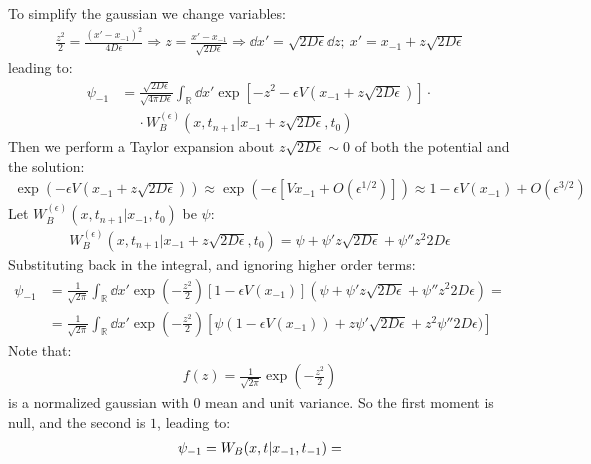 \documentclass[../template.tex]{subfiles}
\begin{document}
\begin{exo}
\begin{enumerate}
        To simplify the gaussian we change variables:
        \begin{align*}
           \frac{z^2}{2}  = \frac{(x'-x_{-1})^2}{4 D \epsilon}  \Rightarrow z = \frac{x'-x_{-1}}{\sqrt{2D \epsilon}} \Rightarrow \dd{x'} = \sqrt{2 D \epsilon} \dd{z}; \> x'=x_{-1}+z\sqrt{2 D \epsilon}
        \end{align*}
        leading to:
        \begin{align*}
            \psi_{-1} &= \frac{\sqrt{2 D \epsilon}}{\sqrt{4 \pi D \epsilon}} \int_{\mathbb{R}} \dd{x'} \exp\left[-z^2 - \epsilon V(x_{-1}+z\sqrt{2D \epsilon})\right]\cdot\\
            &\quad\> \cdot W_B^{(\epsilon)}(x, t_{n+1}|x_{-1}+z\sqrt{2 D \epsilon},t_0)
        \end{align*}
        Then we perform a Taylor expansion about $z\sqrt{2 D \epsilon} \sim 0$ of both the potential and the solution:
        \begin{align*}
            \exp(-\epsilon V(x_{-1}+z\sqrt{2 D \epsilon})) \approx \exp(-\epsilon[ V x_{-1} + O(\epsilon^{1/2})]) \approx 1 - \epsilon V(x_{-1}) + O(\epsilon^{3/2})
        \end{align*}
        Let $W_B^{(\epsilon)}(x,t_{n+1}|x_{-1},t_0)$ be $\psi$:
        \begin{align*}
            W_B^{(\epsilon)}(x,t_{n+1}|x_{-1}+z\sqrt{2 D \epsilon},t_0) = \psi + \psi' z \sqrt{2 D \epsilon} + \psi'' z^2 2 D \epsilon
        \end{align*}
        Substituting back in the integral, and ignoring higher order terms:
        \begin{align*}
            \psi_{-1} &= \frac{1}{\sqrt{2\pi}} \int_{\mathbb{R}} \dd{x'} \exp\left(-\frac{z^2}{2} \right)[1- \epsilon V(x_{-1})](\psi + \psi' z \sqrt{2 D \epsilon} + \psi'' z^2 2 D \epsilon) =\\
            &=\frac{1}{\sqrt{2 \pi}} \int_{\mathbb{R}}\dd{x'} \exp\left(-\frac{z^2}{2} \right) \left[\psi(1-\epsilon V(x_{-1})) +z\psi'  \sqrt{2 D \epsilon}  +z^2\psi''2D \epsilon )\right]
        \end{align*}
        Note that:
        \begin{align*}
            f(z) = \frac{1}{\sqrt{2 \pi}} \exp\left(-\frac{z^2}{2} \right) 
        \end{align*}
        is a normalized gaussian with $0$ mean and unit variance. So the first moment is null, and the second is $1$, leading to:
        \begin{align*}
            \psi_{-1} = W_B(x,t|x_{-1},t_{-1}) = \span \\

\end{align*}
\end{enumerate}
\end{exo}
\end{document}
